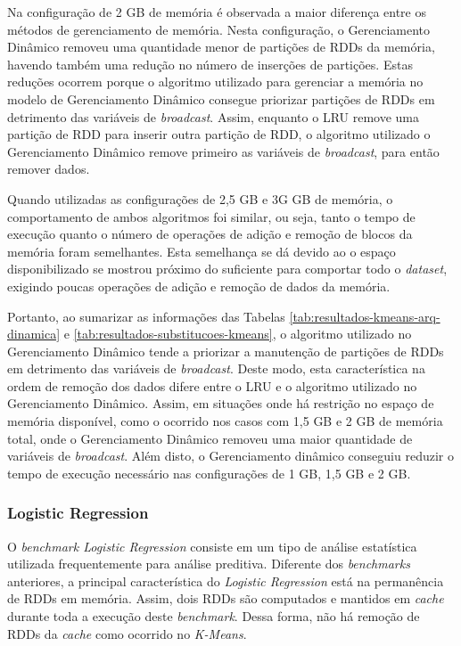 Na configuração de 2 GB de memória é observada a maior diferença entre os métodos de gerenciamento de memória. Nesta configuração, o Gerenciamento Dinâmico removeu uma quantidade menor de partições de RDDs da memória, havendo também uma redução no número de inserções de partições. Estas reduções ocorrem porque o algoritmo utilizado para gerenciar a memória no modelo de Gerenciamento Dinâmico consegue priorizar partições de RDDs em detrimento das variáveis de \textit{broadcast}. Assim, enquanto o LRU remove uma partição de RDD para inserir outra partição de RDD, o algoritmo utilizado o Gerenciamento Dinâmico remove primeiro as variáveis de \textit{broadcast}, para então remover dados.

Quando utilizadas as configurações de 2,5 GB e 3G GB de memória, o comportamento de ambos algoritmos foi similar, ou seja, tanto o tempo de execução quanto o número de operações de adição e remoção de blocos da memória foram semelhantes. Esta semelhança se dá devido ao o espaço disponibilizado se mostrou próximo do suficiente para comportar todo o \textit{dataset}, exigindo poucas operações de adição e remoção de dados da memória.

Portanto, ao sumarizar as informações das Tabelas  \ref{tab:resultados-kmeans-arq-dinamica} e  \ref{tab:resultados-substitucoes-kmeans}, o algoritmo utilizado no Gerenciamento Dinâmico tende a priorizar a manutenção de partições de RDDs em detrimento das variáveis de \textit{broadcast}. Deste modo, esta característica na ordem de remoção dos dados difere entre o LRU e o algoritmo utilizado no Gerenciamento Dinâmico. Assim, em situações onde há restrição no espaço de memória disponível, como o ocorrido nos casos com 1,5 GB e 2 GB de memória total, onde o Gerenciamento Dinâmico removeu uma maior quantidade de variáveis de \textit{broadcast}. Além disto, o Gerenciamento dinâmico conseguiu reduzir o tempo de execução necessário nas configurações de 1 GB, 1,5 GB e 2 GB.


\subsubsection{Logistic Regression}
O \textit{benchmark Logistic Regression} consiste em um tipo de análise estatística utilizada frequentemente para análise preditiva. Diferente dos \textit{benchmarks} anteriores, a principal característica do \textit{Logistic Regression} está na permanência de RDDs em memória. Assim, dois RDDs são computados e mantidos em \textit{cache} durante toda a execução deste \textit{benchmark}. Dessa forma, não há remoção de RDDs da \textit{cache} como ocorrido no \textit{K-Means}.

